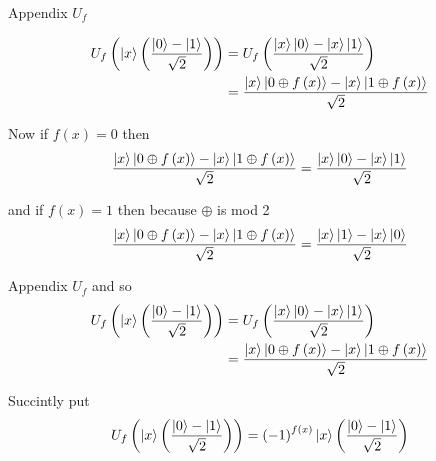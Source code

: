 \documentclass{beamer}
\begin{document}
\begin{frame}{Appendix $U_f$}

\begin{eqnarray*}
U_{f}\left(\Ket{x}\left(\frac{\Ket{0}-\Ket{1}}{\sqrt{2}}\right)\right)	&=	U_{f}\left(\frac{\Ket{x}\Ket{0}-\Ket{x}\Ket{1}}{\sqrt{2}}\right)\\
&=	\frac{\Ket{x}\Ket{0\oplus f\left(x\right)}-\Ket{x}\Ket{1\oplus f\left(x\right)}}{\sqrt{2}}
\end{eqnarray*}

Now if $f\left(x\right)=0$ then 
\[
\frac{\Ket{x}\Ket{0\oplus f\left(x\right)}-\Ket{x}\Ket{1\oplus f\left(x\right)}}{\sqrt{2}}=\frac{\Ket{x}\Ket{0}-\Ket{x}\Ket{1}}{\sqrt{2}}
\]

and if $f\left(x\right)=1$ then because $\oplus$ is mod 2 
\[
\frac{\Ket{x}\Ket{0\oplus f\left(x\right)}-\Ket{x}\Ket{1\oplus f\left(x\right)}}{\sqrt{2}}=\frac{\Ket{x}\Ket{1}-\Ket{x}\Ket{0}}{\sqrt{2}}
\]


\end{frame}
\begin{frame}{Appendix $U_f$}
and so
\begin{eqnarray*}
U_{f}\left(\Ket{x}\left(\frac{\Ket{0}-\Ket{1}}{\sqrt{2}}\right)\right)	&=	U_{f}\left(\frac{\Ket{x}\Ket{0}-\Ket{x}\Ket{1}}{\sqrt{2}}\right)\\
	&=	\frac{\Ket{x}\Ket{0\oplus f\left(x\right)}-\Ket{x}\Ket{1\oplus f\left(x\right)}}{\sqrt{2}}
\end{eqnarray*}

Succintly put 
\[
U_{f}\left(\Ket{x}\left(\frac{\Ket{0}-\Ket{1}}{\sqrt{2}}\right)\right)	=	\left(-1\right)^{f\left(x\right)}\Ket{x}\left(\frac{\Ket{0}-\Ket{1}}{\sqrt{2}}\right)
\]
\end{frame}
\end{document}
